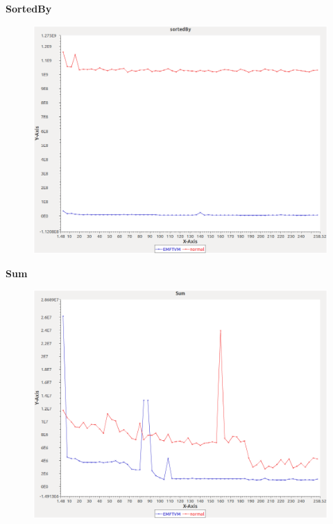 \noindent\textbf{SortedBy}

\begin{figure}[h]
\centering
\includegraphics[width=\textwidth]{graphs/set/sortedBy}
\end{figure}
\pagebreak

\noindent\textbf{Sum}

\begin{figure}[h]
\centering
\includegraphics[width=\textwidth]{graphs/set/Sum}
\end{figure}
\pagebreak

